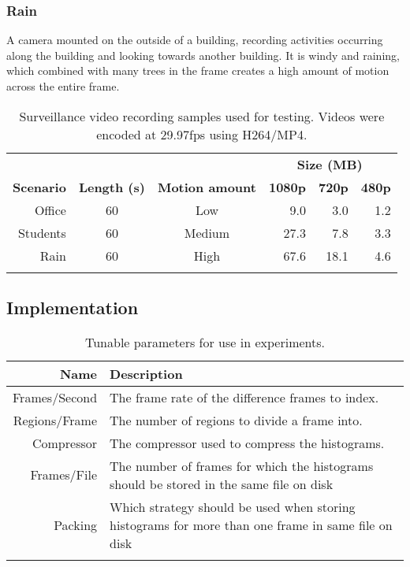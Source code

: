 \subsubsection{Rain}
A camera mounted on the outside of a building, recording activities occurring along the building and looking towards another building. It is windy and raining, which combined with many trees in the frame creates a high amount of motion across the entire frame.

\begin{table}[t]
    \caption{Surveillance video recording samples used for testing. Videos were encoded at 29.97fps using H264/MP4.}\label{tab:scenarios}
	\centering
    \begin{tabular}{r c c r r r }
	~ & ~ & ~ & \multicolumn{3}{c}{\textbf{Size (MB)}} \\ \cline{4-6}
    \textbf{Scenario}  & \textbf{Length (s)} & \textbf{Motion amount} & \textbf{1080p} & \textbf{720p} & \textbf{480p} \\ \hline\noalign{\smallskip}
    Office   & 60    & Low           & 9.0             & 3.0    	& 1.2        \\
    Students & 60    & Medium        & 27.3            & 7.8    	& 3.3        \\
    Rain     & 60    & High          & 67.6            & 18.1    	& 4.6        \\\noalign{\smallskip}
    \hline
    \end{tabular}
\end{table}

\subsection{Implementation}
\begin{table}[b]
    \caption{Tunable parameters for use in experiments.}\label{tab:parameters}
	\centering
    \begin{tabular}{r p{2.5in}}
    \textbf{Name} & \textbf{Description} \\ \hline\noalign{\smallskip}
    Frames/Second   & The frame rate of the difference frames to index. \\
    Regions/Frame   & The number of regions to divide a frame into. \\
    Compressor      & The compressor used to compress the histograms. \\
    Frames/File     & The number of frames for which the histograms should be stored in the same file on disk \\
    Packing         & Which strategy should be used when storing histograms for more than one frame in same file on disk \\\noalign{\smallskip}
    \hline
    \end{tabular}
\end{table}

